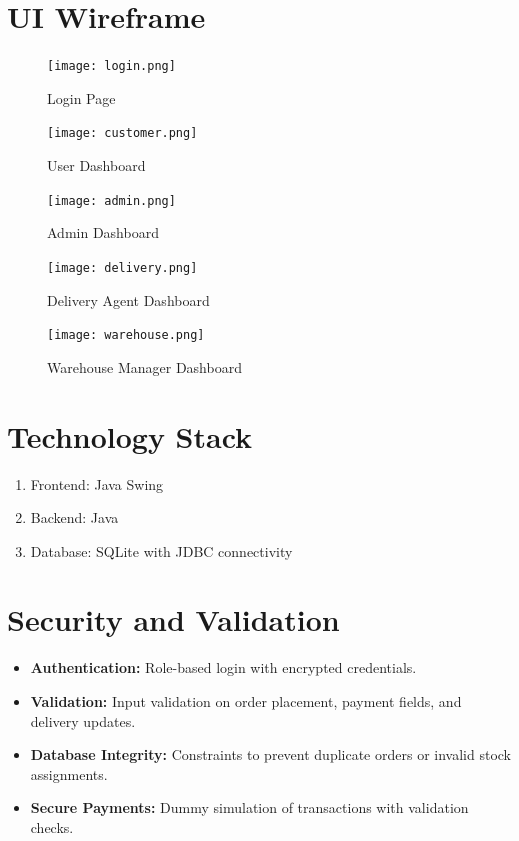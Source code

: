 \documentclass[12pt,a4paper]{article}
\begin{document}
\section{UI Wireframe}
\begin{figure}[H]
    \centering
    \texttt{[image: login.png]} 
    \caption{Login Page}
\end{figure}

\begin{figure}[H]
    \centering
    \texttt{[image: customer.png]} 
    \caption{User Dashboard}
\end{figure}

\begin{figure}[H]
    \centering
    \texttt{[image: admin.png]} 
    \caption{Admin Dashboard}
\end{figure}

\begin{figure}[H]
    \centering
    \texttt{[image: delivery.png]} 
    \caption{Delivery Agent Dashboard}
\end{figure}

\begin{figure}[H]
    \centering
    \texttt{[image: warehouse.png]} 
    \caption{Warehouse Manager Dashboard}
\end{figure}

\section{Technology Stack}
\begin{enumerate}
    \item Frontend: Java Swing
    \item Backend: Java
    \item Database: SQLite with JDBC connectivity
\end{enumerate}

\section{Security and Validation}
\begin{itemize}
    \item \textbf{Authentication:} Role-based login with encrypted credentials.
    \item \textbf{Validation:} Input validation on order placement, payment fields, and delivery updates.
    \item \textbf{Database Integrity:} Constraints to prevent duplicate orders or invalid stock assignments.
    \item \textbf{Secure Payments:} Dummy simulation of transactions with validation checks.
\end{itemize}
\end{document}
